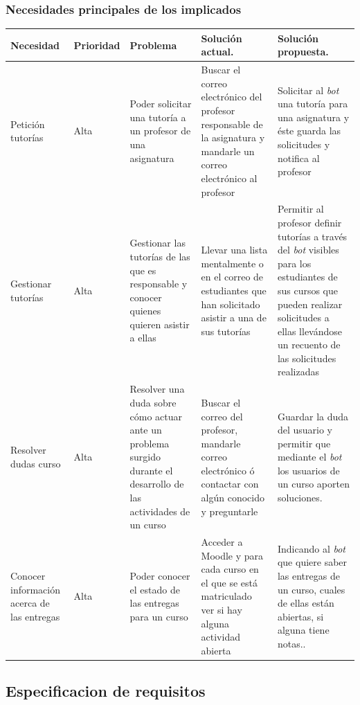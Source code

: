 \subsubsection{Necesidades principales de los implicados}



\begin{table}[H]
\medskip 
\begin{tabular}{|p{2cm}|p{1.6cm}|p{2.5cm}|p{3.5cm}| p{4cm}|}
\hline
{\bf Necesidad } & {\bf Prioridad } & {\bf Problema } & {\bf  Solución actual.} & {\bf  Solución propuesta.}\\
\hline
{ Petición tutorías }& { Alta } & { Poder solicitar una tutoría a un profesor de una asignatura } & {Buscar el correo electrónico del profesor responsable de la asignatura y mandarle un correo electrónico al profesor } & { Solicitar al \textit{bot} una tutoría para una asignatura y éste guarda las solicitudes y notifica al profesor}\\
\hline
{ Gestionar tutorías }& { Alta } & { Gestionar las tutorías de las que es responsable y conocer quienes quieren asistir a ellas } & {Llevar una lista mentalmente o en el correo de estudiantes que han solicitado asistir a una de sus tutorías} & { Permitir al profesor definir tutorías a través del \textit{bot} visibles para los estudiantes de sus cursos que pueden realizar solicitudes a ellas llevándose un recuento de las solicitudes realizadas}\\
\hline
{ Resolver dudas curso }& { Alta } & { Resolver una duda sobre cómo actuar ante un problema surgido durante el desarrollo de las actividades de un curso }& { Buscar el correo del profesor, mandarle correo electrónico ó contactar con algún conocido y preguntarle } & { Guardar la duda del usuario y permitir que mediante el \textit{bot} los usuarios de un curso aporten soluciones.}\\
\hline
{ Conocer información acerca de las entregas  } & { Alta} & { Poder conocer el estado de las entregas para un curso}& { Acceder a Moodle y para cada curso en el que se está matriculado ver si hay alguna actividad abierta } & {Indicando al \textit{bot} que quiere saber las entregas de un curso, cuales de ellas están abiertas, si alguna tiene notas..} \\
\hline


\end{tabular}
\end{table}
\newpage
\subsection{Especificacion de requisitos}

